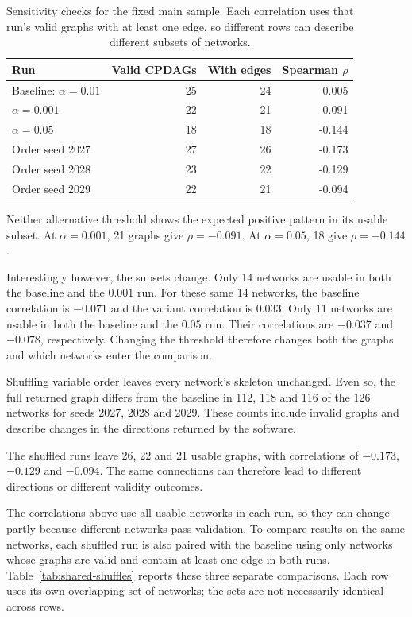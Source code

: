 \documentclass[11pt,a4paper]{article}
\begin{document}
\begin{table}[!htbp]
\centering
\caption{Sensitivity checks for the fixed main sample. Each correlation uses that run's valid graphs with at least one edge, so different rows can describe different subsets of networks.}
\label{tab:sensitivity}
\begin{tabular}{@{}lrrr@{}}
\toprule
Run & Valid CPDAGs & With edges & Spearman $\rho$\\
\midrule
Baseline: $\alpha=0.01$ & 25 & 24 & 0.005\\
$\alpha=0.001$ & 22 & 21 & -0.091\\
$\alpha=0.05$ & 18 & 18 & -0.144\\
Order seed 2027 & 27 & 26 & -0.173\\
Order seed 2028 & 23 & 22 & -0.129\\
Order seed 2029 & 22 & 21 & -0.094\\
\bottomrule
\end{tabular}
\end{table}

Neither alternative threshold shows the expected positive pattern in its usable subset. At $\alpha=0.001$, 21 graphs give $\rho=-0.091$. At $\alpha=0.05$, 18 give $\rho=-0.144$.

Interestingly however, the subsets change. Only 14 networks are usable in both the baseline and the $0.001$ run. For these same 14 networks, the baseline correlation is $-0.071$ and the variant correlation is $0.033$. Only 11 networks are usable in both the baseline and the $0.05$ run. Their correlations are $-0.037$ and $-0.078$, respectively. Changing the threshold therefore changes both the graphs and which networks enter the comparison.

Shuffling variable order leaves every network's skeleton unchanged. Even so, the full returned graph differs from the baseline in 112, 118 and 116 of the 126 networks for seeds 2027, 2028 and 2029. These counts include invalid graphs and describe changes in the directions returned by the software.

The shuffled runs leave 26, 22 and 21 usable graphs, with correlations of $-0.173$, $-0.129$ and $-0.094$. The same connections can therefore lead to different directions or different validity outcomes.

The correlations above use all usable networks in each run, so they can change partly because different networks pass validation. To compare results on the same networks, each shuffled run is also paired with the baseline using only networks whose graphs are valid and contain at least one edge in both runs. Table~\ref{tab:shared-shuffles} reports these three separate comparisons. Each row uses its own overlapping set of networks; the sets are not necessarily identical across rows.
\end{document}
